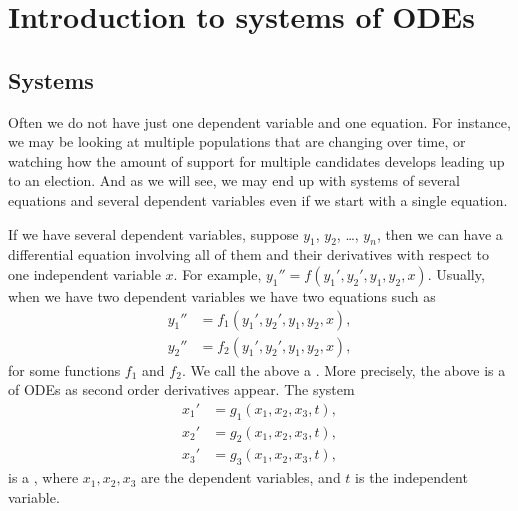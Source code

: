 \section{Introduction to systems of ODEs} \label{sec:introtosys}



\subsection{Systems}

Often we do not have just one dependent variable and one equation. For instance, we may be looking at multiple populations that are changing over time, or watching how the amount of support for multiple candidates develops leading up to an election. And as we will see, we may end up with systems of several
equations and several dependent variables even if we start with a single
equation.

If we have several dependent variables,
suppose $y_1$, $y_2$, \ldots, $y_n$,
then
we can have a differential equation involving all of them and their
derivatives with respect to one independent variable $x$.
For example, $y_1'' = f(y_1',y_2',y_1,y_2,x)$.
Usually, when we have two dependent variables we have two equations
such as
\begin{align*}
y_1'' & = f_1(y_1',y_2',y_1,y_2,x) , \\
y_2'' & = f_2(y_1',y_2',y_1,y_2,x) ,
\end{align*}
for some functions $f_1$ and $f_2$.  We call the above a
\emph{}.
More precisely, the above is a \emph{}
of ODEs as second
order derivatives appear.
The system
\begin{align*}
x_1' & = g_1(x_1,x_2,x_3,t) , \\
x_2' & = g_2(x_1,x_2,x_3,t) , \\
x_3' & = g_3(x_1,x_2,x_3,t) ,
\end{align*}
is a \emph{}, where $x_1,x_2,x_3$ are
the dependent variables,
and $t$ is the independent variable.

